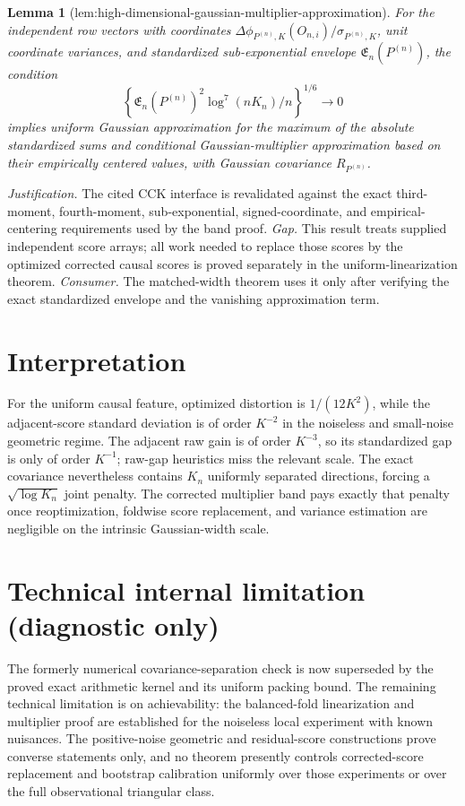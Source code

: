 \documentclass{article}
\newtheorem{lemma}{Lemma}
\begin{document}
\begin{lemma}[lem:high-dimensional-gaussian-multiplier-approximation]\label{lem:high-dimensional-gaussian-multiplier-approximation}
For the independent row vectors with coordinates \(\Delta\phi_{P^{(n)},K}(O_{n,i})/\sigma_{P^{(n)},K}\), unit coordinate variances, and standardized sub-exponential envelope \(\mathfrak E_n(P^{(n)})\), the condition
\[
 \left\{\mathfrak E_n(P^{(n)})^2\log^7(nK_n)/n\right\}^{1/6}\to0
\]
implies uniform Gaussian approximation for the maximum of the absolute standardized sums and conditional Gaussian-multiplier approximation based on their empirically centered values, with Gaussian covariance \(R_{P^{(n)}}\).
\end{lemma}
\par\smallskip\noindent \textit{Justification.} The cited CCK interface is revalidated against the exact third-moment, fourth-moment, sub-exponential, signed-coordinate, and empirical-centering requirements used by the band proof. \textit{Gap.} This result treats supplied independent score arrays; all work needed to replace those scores by the optimized corrected causal scores is proved separately in the uniform-linearization theorem. \textit{Consumer.} The matched-width theorem uses it only after verifying the exact standardized envelope and the vanishing approximation term.

\section{Interpretation}

For the uniform causal feature, optimized distortion is \(1/(12K^2)\), while the adjacent-score standard deviation is of order \(K^{-2}\) in the noiseless and small-noise geometric regime. The adjacent raw gain is of order \(K^{-3}\), so its standardized gap is only of order \(K^{-1}\); raw-gap heuristics miss the relevant scale. The exact covariance nevertheless contains \(K_n\) uniformly separated directions, forcing a \(\sqrt{\log K_n}\) joint penalty. The corrected multiplier band pays exactly that penalty once reoptimization, foldwise score replacement, and variance estimation are negligible on the intrinsic Gaussian-width scale.

\section*{Technical internal limitation (diagnostic only)}

The formerly numerical covariance-separation check is now superseded by the proved exact arithmetic kernel and its uniform packing bound. The remaining technical limitation is on achievability: the balanced-fold linearization and multiplier proof are established for the noiseless local experiment with known nuisances. The positive-noise geometric and residual-score constructions prove converse statements only, and no theorem presently controls corrected-score replacement and bootstrap calibration uniformly over those experiments or over the full observational triangular class.
\end{document}
